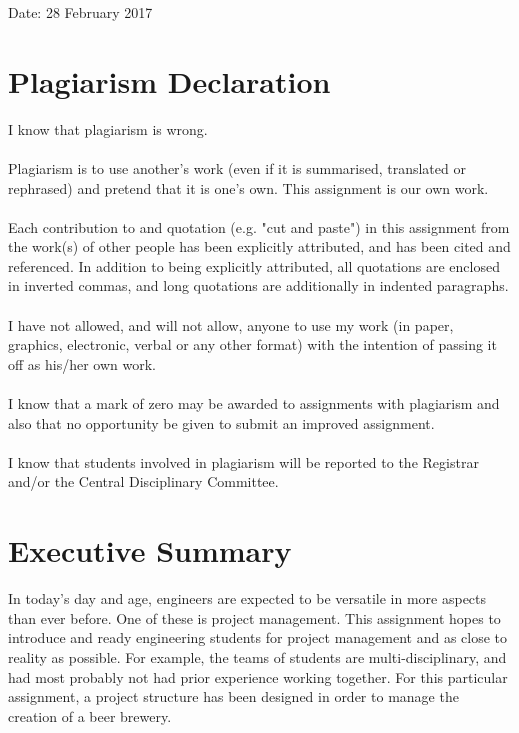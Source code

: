 \begin{titlepage}
\begin{center}
            \large
            Date: 28 February 2017
            
        \end{center}
\end{titlepage}

\newpage



\section*{Plagiarism Declaration}

I know that plagiarism is wrong.\\\\
\noindent
Plagiarism is to use another's work (even if it is summarised, translated or rephrased) and pretend that it is one's own. This assignment is our own work.\\\\
\noindent
Each contribution to and quotation (e.g. "cut and paste") in this assignment from the work(s) of other people has been explicitly attributed, and has been cited and referenced. In addition to being explicitly attributed, all quotations are enclosed in inverted commas, and long quotations are additionally in indented paragraphs.\\\\
\noindent
I have not allowed, and will not allow, anyone to use my work (in paper, graphics, electronic, verbal or any other format) with the intention of passing it off as his/her own work.\\\\
\noindent
I know that a mark of zero may be awarded to assignments with plagiarism and also that no opportunity be given to submit an improved assignment.\\\\
\noindent
I know that students involved in plagiarism will be reported to the Registrar and/or the Central Disciplinary Committee.

\section*{Executive Summary}
In today's day and age, engineers are expected to be versatile in more aspects than ever
before. One of these is project management. This assignment hopes to introduce and
ready engineering students for project management and as close to reality as possible. For
example, the teams of students are multi-disciplinary, and had most probably not had prior
experience working together. For this particular assignment, a project structure has been designed in order to manage the creation of a beer brewery.\\

